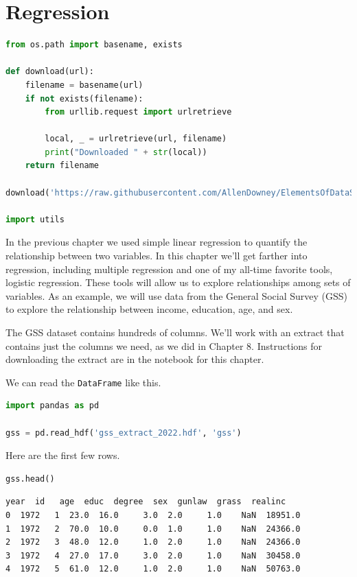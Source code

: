 \hypertarget{regression}{%
\chapter{Regression}\label{regression}}

\begin{lstlisting}[language=Python,style=source]
from os.path import basename, exists

def download(url):
    filename = basename(url)
    if not exists(filename):
        from urllib.request import urlretrieve

        local, _ = urlretrieve(url, filename)
        print("Downloaded " + str(local))
    return filename

download('https://raw.githubusercontent.com/AllenDowney/ElementsOfDataScience/v1/utils.py')

import utils
\end{lstlisting}

In the previous chapter we used simple linear regression to quantify the
relationship between two variables. In this chapter we'll get farther
into regression, including multiple regression and one of my all-time
favorite tools, logistic regression. These tools will allow us to
explore relationships among sets of variables. As an example, we will
use data from the General Social Survey (GSS) to explore the
relationship between income, education, age, and sex.

The GSS dataset contains hundreds of columns. We'll work with an extract
that contains just the columns we need, as we did in Chapter 8.
Instructions for downloading the extract are in the notebook for this
chapter.

We can read the \passthrough{\lstinline!DataFrame!} like this.

\begin{lstlisting}[language=Python,style=source]
import pandas as pd

gss = pd.read_hdf('gss_extract_2022.hdf', 'gss')
\end{lstlisting}

Here are the first few rows.

\begin{lstlisting}[language=Python,style=source]
gss.head()
\end{lstlisting}

\begin{lstlisting}[style=output]
   year  id   age  educ  degree  sex  gunlaw  grass  realinc
0  1972   1  23.0  16.0     3.0  2.0     1.0    NaN  18951.0
1  1972   2  70.0  10.0     0.0  1.0     1.0    NaN  24366.0
2  1972   3  48.0  12.0     1.0  2.0     1.0    NaN  24366.0
3  1972   4  27.0  17.0     3.0  2.0     1.0    NaN  30458.0
4  1972   5  61.0  12.0     1.0  2.0     1.0    NaN  50763.0
\end{lstlisting}

